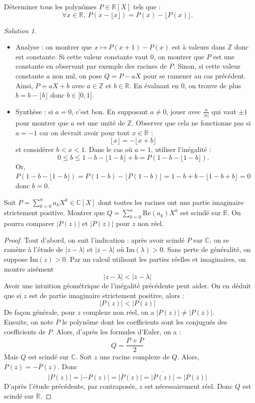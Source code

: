 \documentclass[french]{book}
\newcommand{\Z}{\mathbb{Z}}
\newcommand{\R}{\mathbb{R}}
\newcommand{\C}{\mathbb{C}}
\theoremstyle{definition}
\theoremstyle{remark}
\newtheorem*{sol}{Solution}
\begin{document}
\begin{exo}[2]{}
	Déterminer tous les polynômes $P\in\R[X]$ tels que :
	$$\forall x\in\R,\ P(x-\lfloor x\rfloor)=P(x)-\lfloor P(x)\rfloor.$$
\end{exo}
\begin{sol}
	\begin{itemize}
		\item Analyse : on montrer que $x\mapsto P(x+1)-P(x)$ est à valeurs dans $\Z$ donc est constante. Si cette valeur constante vaut $0$, on montrer que $P$ est une constante en observant par exemple des racines de $P$. Sinon, si cette valeur constante $a$ non nul, on pose $Q=P-aX$ pour se ramener au cas précédent. Ainsi, $P=aX+b$ avec $a\in\Z$ et $b\in\R$. En évaluant en $0$, on trouve de plus $b=b-\lfloor b\rfloor$ donc $b\in[0,1[$.
		\item Synthèse : si $a=0$, c'est bon. En supposant $a\ne 0$, jouer avec $\displaystyle \frac{a}{\lvert a\rvert}$ qui vaut $\pm 1$ pour montrer que $a$ est une unité de $\Z$. Observer que cela ne fonctionne pas si $a=-1$ car on devrait avoir pour tout $x\in\R$ : 
		$$ \lfloor x\rfloor=-\lfloor x+b\rfloor$$ et considérer $b<x<1$. Dans le cas où $a=1$, utiliser l'inégalité :
		$$0\leqslant b\leqslant 1-b-\lfloor 1-b\rfloor+b=P(1-b-\lfloor1-b\rfloor).$$
		Or, $P(1-b-\lfloor1-b\rfloor)=P(1-b)-\lfloor P(1-b)\rfloor=1-b+b-\lfloor 1-b+b\rfloor=0$ donc $b=0$.
	\end{itemize}
\end{sol}


\begin{exo}[2]{}
	Soit $P=\displaystyle\sum_{k=0}^{n}a_kX^k\in\C[X]$ dont toutes les racines ont une partie imaginaire strictement positive. Montrer que $Q=\displaystyle\sum_{k=0}^{n}\text{Re}(a_k)X^k$ est scindé sur $\R$. On pourra comparer $\lvert P(z)\rvert$ et $\lvert P(\overline{z})\rvert$ pour $z$ non réel.
\end{exo}
\begin{proof}
	Tout d'abord, on suit l'indication : après avoir scindé $P$ sur $\C$, on se ramène à l'étude de $\lvert z-\lambda\rvert$ et $\lvert \overline{z}-\lambda\rvert$ où $\text{Im}(\lambda)>0$. Sans perte de généralité, on suppose $\text{Im}(z)>0$. Par un calcul utilisant les parties réelles et imaginaires, on montre aisément $$\lvert z-\lambda\rvert<\lvert \overline{z}-\lambda\rvert$$ Avoir une intuition géométrique de l'inégalité précédente peut aider. On en déduit que si $z$ est de partie imaginaire strictement positive, alors : $$\lvert P(z)\rvert <\lvert P(\overline{z})\rvert$$ De façon générale, pour $z$ complexe non réel, on a $\lvert P(z)\rvert \ne \lvert P(\overline{z})\rvert$. \\
	Ensuite, on note $\overline{P}$ le polynôme dont les coefficients sont les conjugués des coefficients de $P$. Alors, d'après les formules d'Euler, on a : $$Q=\frac{P+\overline{P}}{2}$$ Mais $Q$ est scindé sur $\C$. Soit $z$ une racine complexe de $Q$. Alors, $P(z)=-\overline{P}(z)$. Donc $$\lvert P(z)\rvert=\lvert -\overline{P}(z)\rvert=\lvert\overline{P}(z)\rvert=\lvert\overline{\overline{P}(z)}\rvert=\lvert P(\overline{z})\rvert$$ D'après l'étude précédente, par contraposée, $z$ est nécessairement réel. Donc $Q$ est scindé sur $\R$.
\end{proof}
\end{document}
